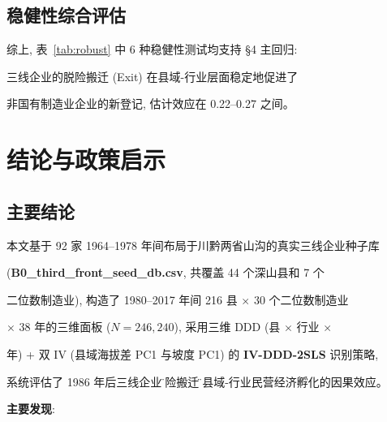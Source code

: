\subsection{稳健性综合评估}



综上, 表~\ref{tab:robust} 中 6 种稳健性测试均支持 §4 主回归:

三线企业的脱险搬迁 (Exit) 在县域-行业层面稳定地促进了

非国有制造业企业的新登记, 估计效应在 0.22--0.27 之间。



\section{结论与政策启示}\label{sec:conclusion}



\subsection{主要结论}



本文基于 92 家 1964--1978 年间布局于川黔两省山沟的真实三线企业种子库

(\textbf{B0\_third\_front\_seed\_db.csv}, 共覆盖 44 个深山县和 7 个

二位数制造业), 构造了 1980--2017 年间 216 县 $\times$ 30 个二位数制造业

$\times$ 38 年的三维面板 ($N=246{,}240$), 采用三维 DDD (县 $\times$ 行业 $\times$

年) + 双 IV (县域海拔差 PC1 与坡度 PC1) 的 \textbf{IV-DDD-2SLS} 识别策略,

系统评估了 1986 年后三线企业\"脱险搬迁\"对县域-行业民营经济孵化的因果效应。



\textbf{主要发现}:



